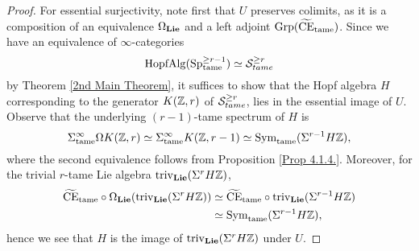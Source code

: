 \begin{proof}

	
	
    For essential surjectivity, note first that  $U$ preserves colimits, as it is a composition of an equivalence $\Omega_{\mathbf{Lie}}$ and a left adjoint $\operatorname{Grp}(\widetilde{\operatorname{CE}}_{\operatorname{\operatorname{tame}}})$. 
    Since we have an equivalence of $\infty$-categories 
    $$\operatorname{HopfAlg}(\operatorname{Sp}^{\geq r-1}_{\operatorname{\operatorname{tame}}})
    \simeq
    {\mathcal{S}}^{\geq r}_{tame}
    $$  by Theorem \ref{2nd Main Theorem},
    it suffices to show that the Hopf algebra $H$ corresponding to the generator $K({\mathbb{Z}},r)$ of ${\mathcal{S}}^{\geq r}_{tame}$, lies in the essential image of $U$. 
    Observe that the underlying $(r-1)$-tame spectrum of $H$ is 
    $$
    \Sigma^{\infty}_{\operatorname{tame}}\Omega K({\mathbb{Z}},r)
    \simeq 
    \Sigma^{\infty}_{\operatorname{tame}} K({\mathbb{Z}}, r-1)
    \simeq \operatorname{Sym}_{\operatorname{\operatorname{tame}}}(\Sigma^{r-1}H{\mathbb{Z}}),
    $$ 
    where the second equivalence follows from Proposition \ref{Prop 4.1.4.}.
    Moreover, for the trivial $r$-tame Lie algebra $\operatorname{triv}_{\mathbf{Lie}}(\Sigma^{r}H{\mathbb{Z}})$,
    \begin{align*}
        \widetilde{\operatorname{CE}}_{\operatorname{\operatorname{tame}}} \circ  \Omega_{\mathbf{Lie}}(\operatorname{triv}_{\mathbf{Lie}}(\Sigma^{r}H{\mathbb{Z}}))
        & \simeq 
        \widetilde{\operatorname{CE}}_{\operatorname{\operatorname{tame}}}\circ \operatorname{triv}_{\mathbf{Lie}} (\Sigma^{r-1}H{\mathbb{Z}})\\
        & \simeq \operatorname{Sym}_{\operatorname{\operatorname{tame}}}(\Sigma^{r-1}H{\mathbb{Z}}),
    \end{align*}
    hence we see that $H$ is the image of $\operatorname{triv}_{\mathbf{Lie}}(\Sigma^{r}H{\mathbb{Z}})$ under $U$.
    
\end{proof}

